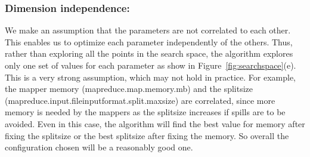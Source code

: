 \noindent\subsubsection*{\bf Dimension independence: } 
We make an assumption that the parameters are not correlated to each other. This enables us to optimize each parameter independently of the others. Thus, rather than exploring all the points in the search space, the algorithm explores only one set of values for each parameter as show in Figure~\ref{fig:searchspace}(e). This is a very strong assumption, which may not hold in practice. For example, the mapper memory (mapreduce.map.memory.mb) and the splitsize (mapreduce.input.fileinputformat.split.maxsize) are correlated, since more memory is needed by the mappers as the splitsize increases if spills are to be avoided. Even in this case, the algorithm will find the best value for memory after fixing the splitsize or the best splitsize after fixing the memory. So overall the configuration chosen will be a reasonably good one.


